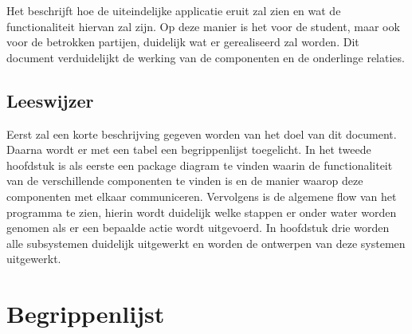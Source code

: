 \documentclass[a4paper, 11pt, oneside]{report}
\begin{document}
Het beschrijft hoe de uiteindelijke applicatie eruit zal zien en wat de functionaliteit hiervan zal zijn. Op deze manier is het voor de student, maar ook voor de betrokken partijen, duidelijk wat er gerealiseerd zal worden. Dit document verduidelijkt de werking van de componenten en de onderlinge relaties. 

\section{Leeswijzer}
\label{inleiding:beschrijving:leeswijzer}
Eerst zal een korte beschrijving gegeven worden van het doel van dit document.
Daarna wordt er met een tabel een begrippenlijst toegelicht.
In het tweede hoofdstuk is als eerste een package diagram te vinden waarin de functionaliteit van de verschillende componenten te vinden is en de manier waarop deze componenten met elkaar communiceren.
Vervolgens is de algemene flow van het programma te zien, hierin wordt duidelijk welke stappen er onder water worden genomen als er een bepaalde actie wordt uitgevoerd.
In hoofdstuk drie worden alle subsystemen duidelijk uitgewerkt en worden de ontwerpen van deze systemen uitgewerkt. 
\chapter*{Begrippenlijst}
\label{inleiding:begrippenlijst}
\end{document}
